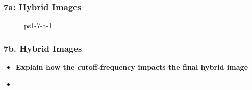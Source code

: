 \documentclass[../report.tex]{subfiles}
\begin{document}
    
\begin{frame}
	\frametitle{7a: Hybrid Images}
	\begin{figure}[!htb]
		\centering
		\caption{ps1-7-a-1}
	\end{figure}
\end{frame}

\begin{frame}[t]
	\frametitle{7b. Hybrid Images}
	\begin{normalsize}
		\begin{itemize}
			\setlength\itemsep{1em}\fontsize{6pt}{6pt}
			
			\item[]\textbf{Explain how the cutoff-frequency impacts the final hybrid image}
			
			\item[]{\selectfont\textcolor{blue}{}}
			
		\end{itemize}
	\end{normalsize}
\end{frame}

    
\end{document}
